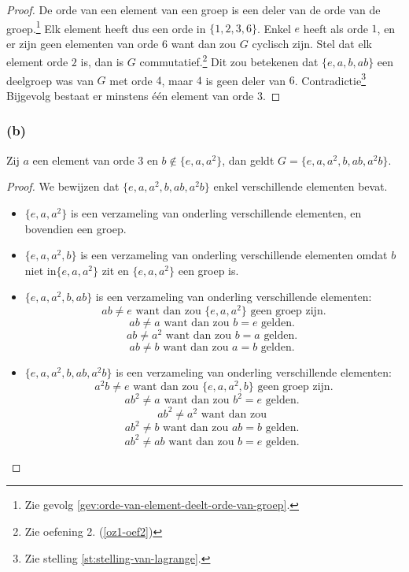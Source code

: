 \documentclass[main.tex]{subfiles}
\begin{document}
\begin{proof}
De orde van een element van een groep is een deler van de orde van de groep.\footnote{Zie gevolg \ref {gev:orde-van-element-deelt-orde-van-groep}.}
Elk element heeft dus een orde in $\{ 1, 2, 3, 6 \}$.
Enkel $e$ heeft als orde $1$, en er zijn geen elementen van orde $6$ want dan zou $G$ cyclisch zijn.
Stel dat elk element orde $2$ is, dan is $G$ commutatief.\footnote{Zie oefening 2. (\ref{oz1-oef2})}
Dit zou betekenen dat $\{ e,a,b,ab \}$ een deelgroep was van $G$ met orde $4$, maar $4$ is geen deler van $6$. Contradictie\footnote{Zie stelling \ref{st:stelling-van-lagrange}.}
Bijgevolg bestaat er minstens \'e\'en element van orde 3.
\end{proof}

\subsubsection*{(b)}
Zij $a$ een element van orde $3$ en $b \not\in \{ e,a,a^{2} \}$, dan geldt $G= \{ e,a,a^{2},b,ab,a^{2}b \}$.

\begin{proof}
  We bewijzen dat $\{ e,a,a^{2},b,ab,a^{2}b \}$ enkel verschillende elementen bevat.
  \begin{itemize}
  \item $\{ e,a,a^{2} \}$ is een verzameling van onderling verschillende elementen, en bovendien een groep.
  \item $\{ e,a,a^{2},b \}$ is een verzameling van onderling verschillende elementen omdat $b$ niet in$\{ e,a,a^{2} \}$ zit en $\{ e,a,a^{2} \}$ een groep is.
  \item $\{ e,a,a^{2},b,ab \}$ is een verzameling van onderling verschillende elementen:
    \[ ab \neq e \text{ want dan zou } \{ e,a,a^{2} \} \text{ geen groep zijn.} \]
    \[ ab \neq a \text{ want dan zou } b = e \text{ gelden. } \]
    \[ ab \neq a^{2} \text{ want dan zou } b = a \text{ gelden. } \]
    \[ ab \neq b \text{ want dan zou } a = b \text{ gelden. } \]
  \item $\{ e,a,a^{2},b,ab,a^{2}b \}$ is een verzameling van onderling verschillende elementen:
    \[ a^{2}b \neq e \text{ want dan zou } \{ e,a,a^{2},b \} \text{ geen groep zijn.} \]
    \[ ab^{2} \neq a \text{ want dan zou } b^{2} = e \text{ gelden. } \]
    \[ ab^{2} \neq a^{2} \text{ want dan zou }  \]
    \[ ab^{2} \neq b \text{ want dan zou } ab = b \text{ gelden. } \]
    \[ ab^{2} \neq ab \text{ want dan zou } b = e \text{ gelden. } \]
  \end{itemize}
  
\end{proof}
\end{document}
